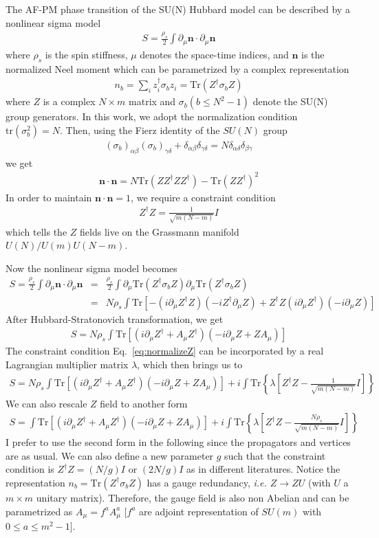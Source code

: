 \documentclass[aps,preprint,superscriptaddress]{revtex4-1}
\newcommand{\bea}{\begin{eqnarray}}
\newcommand{\eea}{\end{eqnarray}}
\newcommand{\bn}{\mathbf{n}}
\newcommand{\ie}{\textit{i.e.{ }}}
\begin{document}
The AF-PM phase transition of the SU(N) Hubbard model can be described by a nonlinear sigma model
\bea S=\frac{\rho_s}{2}\int \partial_\mu\bn \cdot \partial_\mu\bn \eea
where $\rho_s$ is the spin stiffness, $\mu$ denotes the space-time indices, and $\bn$ is the normalized Neel moment which can be parametrized by a complex representation \bea n_b=\sum_i z_i^\dag \sigma_b z_i=\mathrm{Tr}(Z^\dag\sigma_b Z) \eea  where $Z$ is a complex $N\times m$ matrix and $\sigma_b (b\le N^2-1)$ denote the SU(N) group generators. In this work, we adopt the normalization condition $\mathrm{tr}(\sigma_b^2)=N$. Then, using the Fierz identity of the $SU(N)$ group
\bea (\sigma_b)_{\alpha\beta} (\sigma_b)_{\gamma\delta}+\delta_{\alpha\beta}\delta_{\gamma\delta}=N\delta_{\alpha\delta}\delta_{\beta\gamma} \eea
we get
\bea \bn\cdot\bn = N\mathrm{Tr}(ZZ^\dag Z Z^\dag)-\mathrm{Tr}(ZZ^\dag)^2 \eea
In order to maintain $\bn\cdot\bn=1$, we require a constraint condition \bea Z^\dag Z=\frac{1}{\sqrt{m(N-m)}}I \label{eq:normalizeZ}\eea
which tells the $Z$ fields live on the Grassmann manifold $U(N)/U(m)U(N-m)$. 

Now the nonlinear sigma model becomes
\bea S=\frac{\rho_s}{2}\int\partial_\mu\bn \cdot \partial_\mu\bn&=&\frac{\rho_s}{2}\int\partial_\mu \mathrm{Tr}(Z^\dagger\sigma_b Z) \partial_\mu \mathrm{Tr}(Z^\dagger \sigma_b Z) \nonumber\\
&=& N\rho_s \int\mathrm{Tr}\left[-(i\partial_\mu Z^\dagger Z) (-iZ^\dag \partial_\mu Z) + Z^\dag Z (i\partial_\mu Z^\dagger)(-i\partial_\mu Z)\right] \eea 
After Hubbard-Stratonovich transformation, we get
\bea S=N\rho_s\int \mathrm{Tr}\left[ (i\partial_\mu Z^\dag+A_\mu Z^\dag)(-i\partial_\mu Z+ZA_\mu)  \right] \eea
The constraint condition Eq.~\eqref{eq:normalizeZ} can be incorporated by a real Lagrangian multiplier matrix $\lambda$, which then brings us to
\bea \boxed{ S=N\rho_s\int \mathrm{Tr}\left[ (i\partial_\mu Z^\dag+A_\mu Z^\dag)(-i\partial_\mu Z+ZA_\mu)  \right] + i\int\mathrm{Tr}\left\{\lambda\left[Z^\dag Z-\frac{1}{\sqrt{m(N-m)}}I\right]\right\} } \eea
We can also rescale $Z$ field to another form
\bea \boxed{ S=\int \mathrm{Tr}\left[ (i\partial_\mu Z^\dag+A_\mu Z^\dag)(-i\partial_\mu Z+ZA_\mu)  \right] + i\int\mathrm{Tr}\left\{\lambda\left[Z^\dag Z-\frac{N\rho_s}{\sqrt{m(N-m)}}I\right]\right\} } \eea
{\color{red} I prefer to use the second form in the following since the propagators and vertices are as usual. We can also define a new parameter $g$ such that the constraint condition is $Z^\dag Z=(N/g)I$ or $(2N/g)I$ as in different literatures.} Notice the representation $n_b=\mathrm{Tr}(Z^\dag \sigma_b Z)$ has a gauge redundancy, \ie $Z\rightarrow ZU$ (with $U$ a $m\times m$ unitary matrix). Therefore, the gauge field is also non Abelian and can be parametrized as $A_\mu=f^aA_\mu^a$ [$f^a$ are adjoint representation of $SU(m)$ with $0\le a\le m^2-1$].
\end{document}
